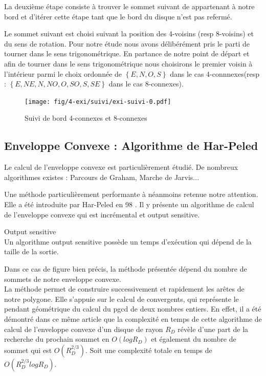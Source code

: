 La deuxième étape consiste à trouver le sommet suivant de appartenant à notre bord et d'itérer cette étape tant que le bord du disque n'est pas refermé.

Le sommet suivant est choisi suivant la position des 4-voisins (resp 8-voisins) et du sens de rotation. Pour notre étude nous avons délibérément pris le parti de tourner dans le sens trigonométrique. En partance de notre point de départ et afin de tourner dans le sens trigonométrique nous choisirons le premier voisin à l'intérieur parmi le choix ordonnée de $\left\{E, N, O, S\right\}$ dans le cas 4-connnexes(resp :  $\left\{E, NE, N, NO, O, SO, S, SE \right\}$ dans le cas 8-connexes).

\begin{figure}[H]
  \centering
  \texttt{[image: fig/4-exi/suivi/exi-suivi-0.pdf]}
  \caption{Suivi de bord 4-connexes et 8-connexes}
\end{figure}
  

\subsection{Enveloppe Convexe : Algorithme de Har-Peled}

Le calcul de l'enveloppe convexe est particulièrement étudié. De nombreux algorithmes existes : Parcours de Graham, Marche de Jarvis... 

Une méthode particulièrement performante à néanmoins retenue notre attention. Elle a été introduite par Har-Peled en 98 \cite{HarPeled98}. Il y présente un algorithme de calcul de l'enveloppe convexe qui est incrémental et output sensitive.


\begin{Definition}{Output sensitive}\\
\label{def:os}
      Un algorithme output sensitive possède un temps d’exécution qui dépend de la taille de la sortie.
\end{Definition}

Dans ce cas de figure bien précis, la méthode présentée dépend du nombre de sommets de notre enveloppe convexe. \\

La méthode permet de construire successivement et rapidement les arêtes de notre polygone. Elle s'appuie sur le calcul de convergents, qui représente le pendant géométrique du calcul du pgcd de deux nombres entiers. 
En effet, il a été démontré dans ce même article que la complexité en temps de cette algorithme de calcul de l'enveloppe convexe d'un disque de rayon $R_D$ révèle d'une part de la recherche du prochain sommet en $O(log R_D)$ et également du nombre de sommet qui est $O( R_{D}^{2/3})$. Soit une complexité totale en temps de  $O( R_{D}^{2/3} log R_D)$.


